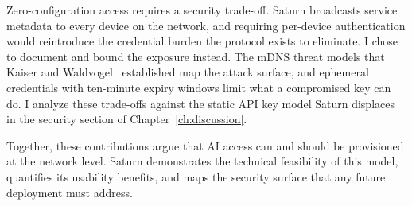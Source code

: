 Zero-configuration access requires a security trade-off. Saturn broadcasts service metadata to every device on the network, and requiring per-device authentication would reintroduce the credential burden the protocol exists to eliminate. I chose to document and bound the exposure instead. The mDNS threat models that Kaiser and Waldvogel~\cite{kaiser2014privacy} established map the attack surface, and ephemeral credentials with ten-minute expiry windows limit what a compromised key can do. I analyze these trade-offs against the static API key model Saturn displaces in the security section of Chapter~\ref{ch:discussion}.

Together, these contributions argue that AI access can and should be provisioned at the network level. Saturn demonstrates the technical feasibility of this model, quantifies its usability benefits, and maps the security surface that any future deployment must address.
